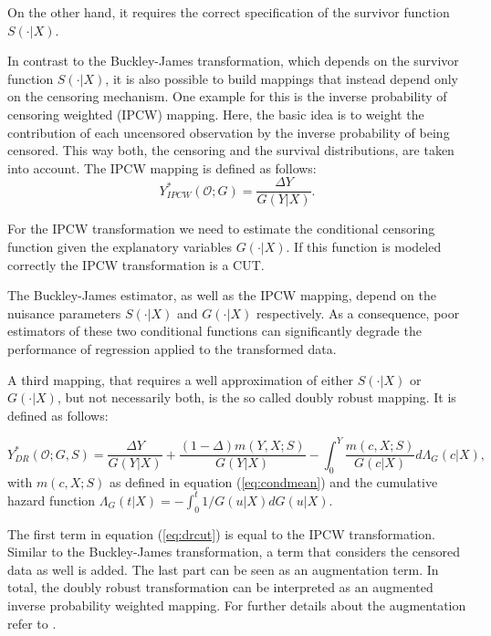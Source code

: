 \documentclass[12pt, a4paper]{article}
\theoremstyle{definition}
\theoremstyle{plain}
\numberwithin{equation}{section}
\numberwithin{figure}{section}
\numberwithin{table}{section}
\begin{document}
	On the other hand, it requires the correct specification of the survivor function $S(\cdot\vert X)$.

	In contrast to the Buckley-James transformation, which depends on the survivor function $S(\cdot\vert X)$, it is also possible to build mappings that instead depend only on the censoring mechanism.
	One example for this is the inverse probability of censoring weighted (IPCW) mapping.
	Here, the basic idea is to weight the contribution of each uncensored observation by the inverse probability of being censored.
	This way both, the censoring and the survival distributions, are taken into account.
	The IPCW mapping is defined as follows:
	\begin{equation*}
	Y_{IPCW}^*(\mathcal{O}; G) = \frac{\Delta Y}{G(Y \vert X)}.
	\end{equation*}

	For the IPCW transformation we need to estimate the conditional censoring function given the explanatory variables $G(\cdot\vert X)$.
	If this function is modeled correctly the IPCW transformation is a CUT.
	
	
	

	The Buckley-James estimator, as well as the IPCW mapping, depend on the nuisance parameters $S(\cdot\vert X)$ and $G(\cdot\vert X)$ respectively.
	As a consequence, poor estimators of these two conditional functions can significantly degrade the performance of regression applied to the transformed data.
	
	A third mapping, that requires a well approximation of either  $S(\cdot\vert X)$ or $G(\cdot\vert X)$, but not necessarily both, is the so called doubly robust mapping.
	It is defined as follows:
	
	\begin{equation}\label{eq:drcut}
	Y_{DR}^* (\mathcal{O}; G, S) = \frac{\Delta Y}{G(Y\vert X)} + \frac{(1-\Delta)m(Y,X;S)}{G(Y \vert X)} - \int_{0}^{Y} \frac{m(c,X;S)}{G(c \vert X)} d\Lambda_G(c \vert X),
	\end{equation}
	with $m(c,X;S)$ as defined in equation (\ref{eq:condmean}) and the cumulative hazard function $\Lambda_G(t\vert X)=-\int_{0}^{t}1/G(u\vert X)dG(u\vert X)$.
	
	The first term in equation (\ref{eq:drcut}) is equal to the IPCW transformation.
	Similar to the Buckley-James transformation, a term that considers the censored data as well is added.
	The last part can be seen as an augmentation term.
	In total, the doubly robust transformation can be interpreted as an augmented inverse probability weighted mapping.
	For further details about the augmentation refer to \citet*{bookfailuretime}.
		
\end{document}

